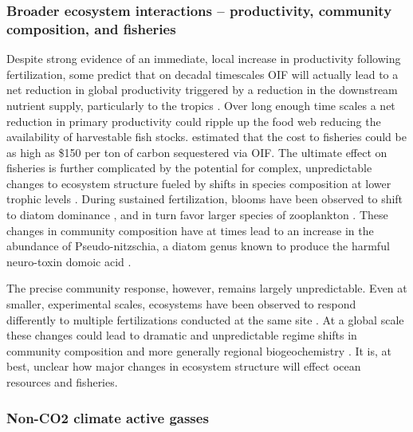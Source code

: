 \subsubsection{Broader ecosystem interactions – productivity, community composition, and fisheries} 

Despite strong evidence of an immediate, local increase in productivity following fertilization, some predict that on decadal timescales OIF will actually lead to a net reduction in global productivity triggered by a reduction in the downstream nutrient supply, particularly to the tropics \parencite{GnanadesikanEffectspatchyocean2003, AumontGlobalizingresultsocean2006,ZaharievPreindustrialhistoricalfertilization2008}. Over long enough time scales a net reduction in primary productivity could ripple up the food web reducing the availability of harvestable fish stocks. \textcite{GnanadesikanEffectspatchyocean2003} estimated that the cost to fisheries could be as high as \$150 per ton of carbon sequestered via OIF. 
The ultimate effect on fisheries is further complicated by the potential for complex, unpredictable changes to ecosystem structure fueled by shifts in species composition at lower trophic levels \parencite{ChisholmWhatControlsPhytoplankton1991}. During sustained fertilization, blooms have been observed to shift to diatom dominance \parencite{MarchettiPhytoplanktonprocessesmesoscale2006}, and in turn favor larger species of zooplankton \parencite{TsudaMesozooplanktonresponseiron2006}. These changes in community composition have at times lead to an increase in the abundance of Pseudo-nitzschia, a diatom genus known to produce the harmful neuro-toxin domoic acid \parencite{TrickIronenrichmentstimulates2010, SilverToxicdiatomsdomoic2010}. 

The precise community response, however, remains largely unpredictable. Even at smaller, experimental scales, ecosystems have been observed to respond differently to multiple fertilizations conducted at the same site \parencite{BoydMesoscaleIronEnrichment2007}. At a global scale these changes could lead to dramatic and unpredictable regime shifts in community composition and more generally regional biogeochemistry \parencite{BoydImpactClimateChange2003}. It is, at best, unclear how major changes in ecosystem structure will effect ocean resources and fisheries.  
\subsubsection{Non-CO2 climate active gasses} 

